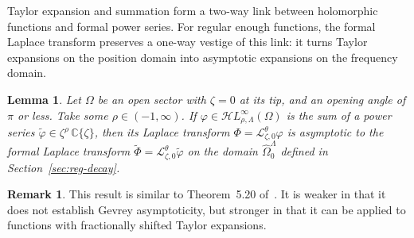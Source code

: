 \documentclass{article}
\newcommand{\singexp}[2]{\mathcal{H}L^\infty_{#1, #2}}
\newcommand{\C}{\mathbb{C}}
\newcommand{\series}[1]{\tilde{#1}}
\newcommand{\laplace}{\mathcal{L}}
\theoremstyle{definition}
\newtheorem{remark}[definition]{Remark}
\theoremstyle{plain}
\newtheorem{lemma}[definition]{Lemma}
\begin{document}
Taylor expansion and summation form a two-way link between holomorphic functions and formal power series. For regular enough functions, the formal Laplace transform preserves a one-way vestige of this link: it turns Taylor expansions on the position domain into asymptotic expansions on the frequency domain.
\begin{lemma}\label{lem:laplace-bridge}
Let $\Omega$ be an open sector with $\zeta = 0$ at its tip, and an opening angle of $\pi$ or less. Take some $\rho \in (-1,\infty)$. If $\varphi \in \singexp{\rho}{\Lambda}(\Omega)$ is the sum of a power series $\series{\varphi} \in \zeta^\rho\,\C\{\zeta\}$, then its Laplace transform $\Phi = \laplace_{\zeta, 0}^\theta \varphi$ is asymptotic to the formal Laplace transform $\series{\Phi} = \laplace_{\zeta, 0}^\theta \series{\varphi}$ on the domain $\widehat{\Omega}_0^\Lambda$ defined in Section~\ref{sec:reg-decay}.
\end{lemma}
\begin{remark}
This result is similar to Theorem~5.20 of~\cite{diverg-resurg-i}. It is weaker in that it does not establish Gevrey asymptoticity, but stronger in that it can be applied to functions with fractionally shifted Taylor expansions.
\end{remark}
\end{document}
